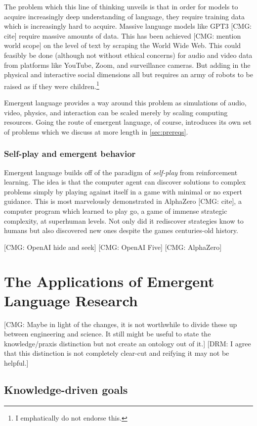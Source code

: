 \documentclass[letterpaper]{report}
\newcommand\cmg[1]{{\color{gray}[CMG: #1]}}
\newcommand\drm[1]{{\color{red}[DRM: #1]}}
\begin{document}
The problem which this line of thinking unveils is that in order for models to acquire increasingly deep understanding of language, they require training data which is increasingly hard to acquire.
Massive language models like GPT3 \cmg{cite} require massive amounts of data.
This has been achieved \cmg{mention world scope} on the level of text by scraping the World Wide Web.
This could feasibly be done (although not without ethical concerns) for audio and video data from platforms like YouTube, Zoom, and surveillance cameras.
But adding in the physical and interactive social dimensions all but requires an army of robots to be raised as if they were children.\footnote{I emphatically do not endorse this.}

Emergent language provides a way around this problem as simulations of audio, video, physics, and interaction can be scaled merely by scaling computing resources.
Going the route of emergent language, of course, introduces its own set of problems which we discuss at more length in \cref{sec:prereqs}.


\subsection{Self-play and emergent behavior}
Emergent language builds off of the paradigm of \emph{self-play} from reinforcement learning.
The idea is that the computer agent can discover solutions to complex problems simply by playing against itself in a game with minimal or no expert guidance.
This is most marvelously demonstrated in AlphaZero \cmg{cite}, a computer program which learned to play go, a game of immense strategic complexity, at superhuman levels.
Not only did it rediscover strategies know to humans but also discovered new ones despite the games centuries-old history.

\cmg{OpenAI hide and seek}
\cmg{OpenAI Five}
\cmg{AlphaZero}

\chapter{The Applications of Emergent Language Research}\label{sec:goals}
\cmg{Maybe in light of the changes, it is not worthwhile to divide these up between engineering and science. It still might be useful to state the knowledge/praxis distinction but not create an ontology out of it.} \drm{I agree that this distinction is not completely clear-cut and reifying it may not be helpful.}
\section{Knowledge-driven goals}
\end{document}
